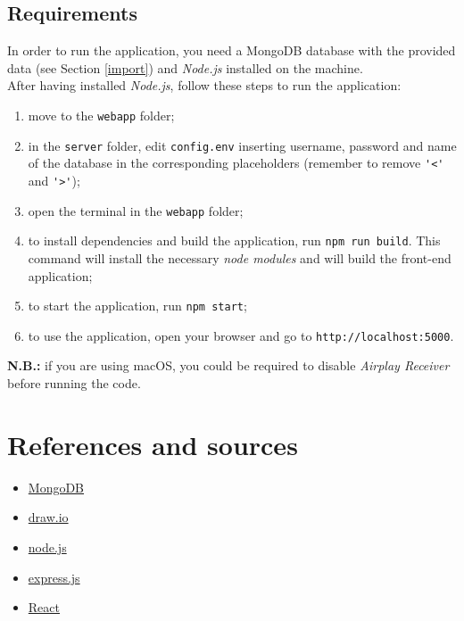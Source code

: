 \documentclass{article}
\begin{document}
\subsection{Requirements}
In order to run the application, you need a MongoDB database with the provided data (see Section \ref{import}) and \textit{Node.js} installed on the machine.\\
After having installed \textit{Node.js}, follow these steps to run the application:
\begin{enumerate}
    \item move to the \verb|webapp| folder;
    \item in the \verb|server| folder, edit \verb|config.env| inserting username, password and name of the database in the corresponding placeholders (remember to remove \verb|'<'| and \verb|'>'|);
    \item open the terminal in the \verb|webapp| folder;
    \item to install dependencies and build the application, run \verb|npm run build|. This command will install the necessary \textit{node modules} and will build the front-end application;
    \item to start the application, run \verb|npm start|;
    \item to use the application, open your browser and go to \verb|http://localhost:5000|.
\end{enumerate}
\textbf{N.B.:} if you are using macOS, you could be required to disable \textit{Airplay Receiver} before running the code. 
\section{References and sources}
\begin{itemize}
    \item \href{https://www.mongodb.com}{MongoDB}
    \item \href{https://app.diagrams.net}{draw.io}
    \item \href{https://nodejs.org}{node.js}
    \item \href{https://expressjs.com}{express.js}
    \item \href{https://reactjs.org/}{React}
\end{itemize}
\end{document}
